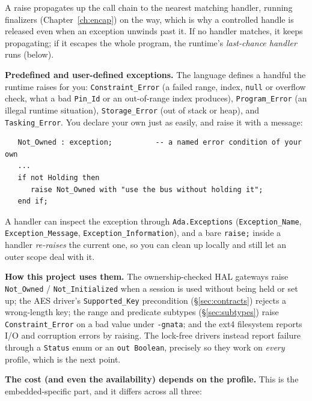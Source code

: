 A raise propagates up the call chain to the nearest matching handler, running
finalizers (Chapter~\ref{ch:encap}) on the way, which is why a controlled
handle is released even when an exception unwinds past it. If no handler matches,
it keeps propagating; if it escapes the whole program, the runtime's
\emph{last-chance handler} runs (below).

\textbf{Predefined and user-defined exceptions.} The language defines a handful
the runtime raises for you: \texttt{Constraint\_Error} (a failed range, index,
\texttt{null} or overflow check, what a bad \texttt{Pin\_Id} or an out-of-range
index produces), \texttt{Program\_Error} (an illegal runtime situation),
\texttt{Storage\_Error} (out of stack or heap), and \texttt{Tasking\_Error}. You
declare your own just as easily, and raise it with a message:

\begin{lstlisting}
   Not_Owned : exception;          -- a named error condition of your own
   ...
   if not Holding then
      raise Not_Owned with "use the bus without holding it";
   end if;
\end{lstlisting}

A handler can inspect the exception through \texttt{Ada.Exceptions}
(\texttt{Exception\_Name}, \texttt{Exception\_Message},
\texttt{Exception\_Information}), and a bare \texttt{raise;} inside a handler
\emph{re-raises} the current one, so you can clean up locally and still let an
outer scope deal with it.

\textbf{How this project uses them.} The ownership-checked HAL gateways raise
\texttt{Not\_Owned} / \texttt{Not\_Initialized} when a session is used without
being held or set up; the AES driver's \texttt{Supported\_Key} precondition
(\S\ref{sec:contracts}) rejects a wrong-length key; the range and predicate
subtypes (\S\ref{sec:subtypes}) raise \texttt{Constraint\_Error} on a bad value
under \texttt{-gnata}; and the ext4 filesystem reports I/O and corruption errors
by raising. The lock-free drivers instead report failure through a \texttt{Status}
enum or an \texttt{out Boolean}, precisely so they work on \emph{every} profile,
which is the next point.

\textbf{The cost (and even the availability) depends on the profile.} This
is the embedded-specific part, and it differs across all three:

